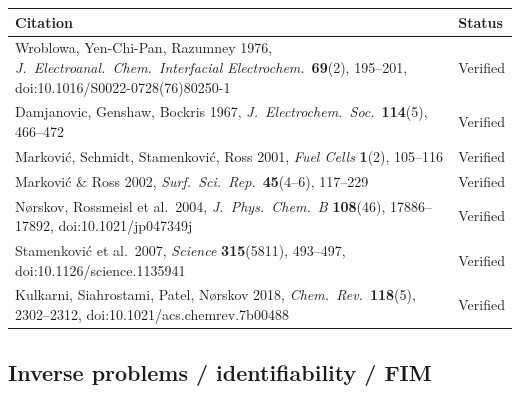 \documentclass[11pt]{article}
\begin{document}
\begin{center}
\small
\begin{tabular}{@{}p{} p{}@{}}
\toprule
\textbf{Citation} & \textbf{Status} \\
\midrule
Wroblowa, Yen-Chi-Pan, Razumney 1976,
\emph{J.~Electroanal.~Chem.~Interfacial Electrochem.}\ \textbf{69}(2),
195--201, doi:10.1016/S0022-0728(76)80250-1 &
Verified \\
Damjanovic, Genshaw, Bockris 1967, \emph{J.~Electrochem.~Soc.}\ \textbf{114}(5),
466--472 &
Verified \\
Markovi\'c, Schmidt, Stamenkovi\'c, Ross 2001, \emph{Fuel Cells} \textbf{1}(2),
105--116 &
Verified \\
Markovi\'c \& Ross 2002, \emph{Surf.~Sci.~Rep.}\ \textbf{45}(4--6), 117--229 &
Verified \\
N{\o}rskov, Rossmeisl et al.\ 2004, \emph{J.~Phys.~Chem.~B} \textbf{108}(46),
17886--17892, doi:10.1021/jp047349j &
Verified \\
Stamenkovi\'c et al.\ 2007, \emph{Science} \textbf{315}(5811), 493--497,
doi:10.1126/science.1135941 &
Verified \\
Kulkarni, Siahrostami, Patel, N{\o}rskov 2018, \emph{Chem.~Rev.}\
\textbf{118}(5), 2302--2312, doi:10.1021/acs.chemrev.7b00488 &
Verified \\
\bottomrule
\end{tabular}
\end{center}

\subsection{Inverse problems / identifiability / FIM}
\end{document}
